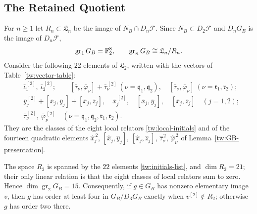 \subsection{The Retained Quotient}\label{tw:retained-section}
For $n\ge1$ let $R_n\subset\mathfrak L_n$ be the image of
$N_B\cap D_n\mathcal F$. Since $N_B\subset D_2\mathcal F$ and $D_nG_B$ is
the image of $D_n\mathcal F$,
\[
 \operatorname{gr}_1G_B=\mathbb F_2^8,\qquad
 \operatorname{gr}_nG_B\cong\mathfrak L_n/R_n .
\]
Consider the following $22$ elements of $\mathfrak L_2$, written with the
vectors of Table~\ref{tw:vector-table}:
\begin{equation}\label{tw:initials-list}
\begin{aligned}
 &\bar\iota_1^{\,[2]},\ \bar\iota_2^{\,[2]};\qquad
 [\bar\tau_\nu,\bar\varphi_\nu]+\bar\tau_\nu^{\,[2]}\ (\nu=\mathfrak q_1,\mathfrak q_2),\quad
 [\bar\tau_\nu,\bar\varphi_\nu]\ (\nu=\mathfrak r_1,\mathfrak r_2);\\
 &\bar y_j^{\,[2]}+[\bar x_j,\bar y_j]+[\bar x_j,\bar z_j],\quad
 \bar x_j^{\,[2]},\quad [\bar x_j,\bar y_j],\quad [\bar x_j,\bar z_j]\quad(j=1,2);\\
 &\bar\tau_\nu^{\,[2]},\ \bar\varphi_\nu^{\,[2]}\quad
 (\nu=\mathfrak q_1,\mathfrak q_2,\mathfrak r_1,\mathfrak r_2).
\end{aligned}
\end{equation}
They are the classes of the eight local relators \eqref{tw:local-initials}
and of the fourteen quadratic elements $\hat x_j^{\,2}$,
$[\hat x_j,\hat y_j]$, $[\hat x_j,\hat z_j]$, $\hat\tau_\nu^{\,2}$,
$\hat\varphi_\nu^{\,2}$ of Lemma~\ref{tw:GB-presentation}.

\begin{lemma}\label{tw:quadratic-layer}
The space $R_2$ is spanned by the $22$ elements \eqref{tw:initials-list}, and
$\dim R_2=21$; their only linear relation is that the eight classes of local
relators sum to zero. Hence $\dim\operatorname{gr}_2G_B=15$. Consequently, if
$g\in G_B$ has nonzero elementary image $v$, then $g$ has order at least four
in $G_B/D_3G_B$ exactly when $v^{[2]}\notin R_2$; otherwise $g$ has order two
there.
\end{lemma}

